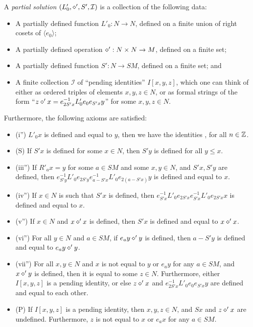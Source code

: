 \begin{definition}\label{part-sol}\leanok  A \emph{partial solution} $(L'_0, \diamond', S', {\mathcal I})$ is a collection of the following data:
\begin{itemize}
  \item A partially defined function $L'_0: N \to N$, defined on a finite union of right cosets of $\langle e_0\rangle$;
  \item A partially defined operation $\diamond': N \times N \to M$, defined on a finite set;
  \item A partially defined function $S': N \to SM$, defined on a finite set; and
  \item A finite collection ${\mathcal  I}$ of ``pending identities'' $I[x,y,z]$, which one can think of either as ordered triples of elements $x,y,z \in N$, or as formal strings of the form ``$z \diamond' x = e_{2S'x}^{-1} L'_0 e_0 e_{S'x} y$'' for some $x,y,z \in N$.
\end{itemize}

Furthermore, the following axioms are satisfied:
\begin{itemize}
  \item (i'')  $L'_0 x$ is defined and equal to $y$, then we have the identities ,  for all $n\in \mathbb{Z}$.
  \item (S) If $S'x$ is defined for some $x \in N$, then $S'y$ is defined for all $y \leq x$.
  \item (iii'') If $R'_a x = y$ for some $a \in SM$ and some $x,y \in N$, and $S'x, S'y$ are defined, then $e_{S'y}^{-1} L'_0 e_{2S'y} e_{a-S'x}^{-1} L'_0 e_{2(a-S'x)} y$ is defined and equal to $x$.
  \item (iv'') If $x \in N$ is such that $S'x$ is defined, then $e_{S'x}^{-1} L'_0 e_{2S'x} e_{S'x}^{-1} L'_0 e_{2S'x} x$ is defined and equal to $x$.
  \item (v'')  If $x \in N$ and $x \diamond' x$ is defined, then $S'x$ is defined and equal to $x \diamond' x$.
  \item (vi'')  For all $y \in N$ and $a \in SM$, if $e_a y \diamond' y$ is defined, then $a - S'y$ is defined and equal to $e_a y \diamond' y$.
  \item (vii'')  For all $x,y \in N$ and $x$ is not equal to $y$ or $e_a y$ for any $a \in SM$, and $x \diamond' y$ is defined, then it is equal to some $z \in N$.  Furthermore, either $I[x,y,z]$ is a pending identity, or else $z \diamond' x$ and $e_{2S'x}^{-1} L'_0 e_0 e_{S'x} y$ are defined and equal to each other.
  \item (P) If $I[x,y,z]$ is a pending identity, then $x,y,z \in N$, and $Sx$ and $z \diamond' x$ are undefined.  Furthermore, $z$ is not equal to $x$ or $e_a x$ for any $a \in SM$.
\end{itemize}


\end{definition}
